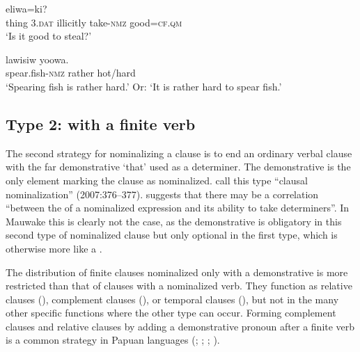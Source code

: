 \ea%
\label{ex:5:x1258}
\gll {}     eliwa=ki? \\
     thing  3.\textsc{dat}  illicitly  take-\textsc{nmz}  good=\textsc{cf}.\textsc{qm} \\
\glt `Is it good to steal?'
\z

\ea%
\label{ex:5:x1259}
\gll {}  lawisiw  yoowa. \\
     spear.fish-\textsc{nmz}  rather  hot/hard \\
\glt `Spearing fish is rather hard.' Or: `It is rather hard to spear fish.'
\z


\subsection{Type 2: with a finite verb} \label{sec:5.7.2}

The second strategy for nominalizing a clause is to end an ordinary verbal clause with the far demonstrative  `that' used as a determiner. The demonstrative is the only element marking the clause as nominalized. \citeauthor{ComrieEtAl2007}  call this type ``clausal nominalization'' (2007:376--377). \citet[506]{Givon1990} suggests that there may be a correlation ``between the  of a nominalized expression and its ability to take determiners''. In Mauwake this is clearly not the case, as the demonstrative is obligatory in this second type of nominalized clause but only optional in the first type, which is otherwise more like a .

The distribution of finite clauses nominalized only with a demonstrative is more restricted than that of clauses with a nominalized verb. They function as relative clauses (), complement clauses (), or temporal clauses (), but not in the many other specific functions where the other type can occur. Forming complement clauses and relative clauses by adding a demonstrative pronoun after a finite verb is a common strategy in Papuan languages (\citealt{Reesink1983b}; \citeyear[228]{Reesink1987}; \citealt[77]{Farr1999}; \citealt[192]{Whitehead2004}). 

